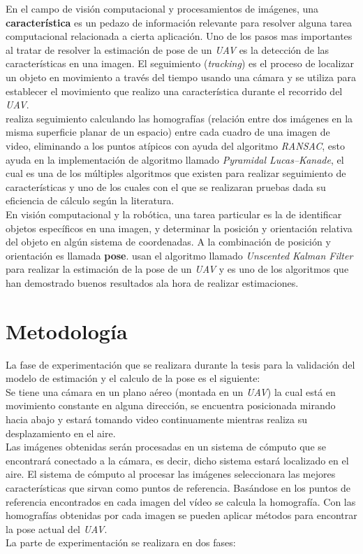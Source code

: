 \documentclass[12pt,letterpaper]{article}
\newlength{\spacing}
\newcommand{\nspace}[1]{\setlength{\baselineskip}{#1\spacing}}
\newenvironment{linespacing}[1]{\nspace{#1}}{}
\begin{document}
\begin{linespacing}{1.5}
En el campo de visión computacional y procesamientos de imágenes, una \textbf{característica} es un pedazo de información relevante para resolver alguna tarea computacional relacionada a cierta aplicación. Uno de los pasos mas importantes al tratar de resolver la estimación de pose de un \textit{UAV} es la detección de las características en una imagen. El seguimiento (\textit{tracking}) es el proceso de localizar un objeto en movimiento a través del tiempo usando una cámara y se utiliza para establecer el movimiento que realizo una característica durante el recorrido del \textit{UAV}. \\
\cite{3DPose} realiza seguimiento calculando las homografías (relación entre dos imágenes en la misma superficie planar de un espacio) entre cada cuadro de una imagen de video, eliminando a los puntos atípicos con ayuda del algoritmo \textit{RANSAC}, esto ayuda en la implementación de algoritmo llamado \textit{Pyramidal Lucas–Kanade}, el cual es una de los múltiples algoritmos que existen para realizar seguimiento de características y uno de los cuales con el que se realizaran pruebas dada su eficiencia de cálculo según la literatura. \\
En visión computacional y la robótica, una tarea particular es la de identificar objetos específicos en una imagen, y determinar la posición y orientación relativa del objeto en algún sistema de coordenadas. A la combinación de posición y orientación es llamada \textbf{pose}. \cite{UKF} usan el algoritmo llamado \textit{Unscented Kalman Filter} para realizar la estimación de la pose de un \textit{UAV} y es uno de los algoritmos que han demostrado buenos resultados ala hora de realizar estimaciones.

\section{Metodología}

La fase de experimentación que se realizara durante la tesis para la validación del modelo de estimación y el calculo de la pose es el siguiente:\\
Se tiene una cámara en un plano aéreo (montada en un \textit{UAV}) la cual está en movimiento constante en alguna dirección, se encuentra posicionada mirando hacia abajo y estará tomando video continuamente mientras realiza su desplazamiento en el aire. \\
Las imágenes obtenidas serán procesadas en un sistema de cómputo que se encontrará conectado a la cámara, es decir, dicho sistema estará localizado en el aire.
El sistema de cómputo al procesar las imágenes seleccionara las mejores características que sirvan como puntos de referencia.
Basándose en los puntos de referencia encontrados en cada imagen del vídeo se calcula la homografía.
Con las homografías obtenidas por cada imagen se pueden aplicar métodos para encontrar la pose actual del \textit{UAV}.\\
La parte de experimentación se realizara en dos fases:


\end{linespacing}
\end{document}
